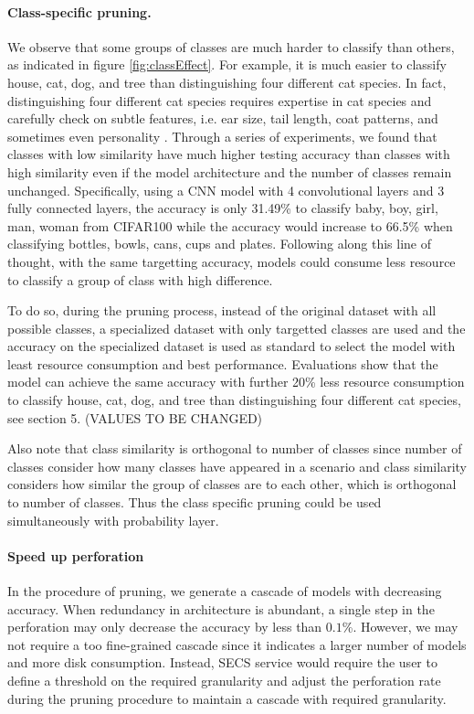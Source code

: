 \documentclass[pageno]{jpaper}
\begin{document}
\paragraph{Class-specific pruning.} 
We observe that some groups of classes are much harder to classify than others, as indicated in figure \ref{fig:classEffect}. For example, it is much easier to classify house, cat, dog, and tree than distinguishing four different cat species. In fact, distinguishing four different cat species requires expertise in cat species and carefully check on subtle features, i.e. ear size, tail length, coat patterns, and sometimes even personality \cite{cat2018}. Through a series of experiments, we found that classes with low similarity have much higher testing accuracy than classes with high similarity even if the model architecture and the number of classes remain unchanged. Specifically, using a CNN model with 4 convolutional layers and 3 fully connected layers, the accuracy is only 31.49\% to classify baby, boy, girl, man, woman from CIFAR100 while the accuracy would increase to 66.5\% when classifying bottles, bowls, cans, cups and plates. Following along this line of thought, with the same targetting accuracy, models could consume less resource to classify a group of class with high difference. 

To do so, during the pruning process, instead of the original dataset with all possible classes, a specialized dataset with only targetted classes are used and the accuracy on the specialized dataset is used as standard to select the model with least resource consumption and best performance. Evaluations show that the model can achieve the same accuracy with further 20\% less resource consumption to classify house, cat, dog, and tree than distinguishing four different cat species, see section 5. (VALUES TO BE CHANGED)

Also note that class similarity is orthogonal to number of classes since number of classes consider how many classes have appeared in a scenario and class similarity considers how similar the group of classes are to each other, which is orthogonal to number of classes. Thus the class specific pruning could be used simultaneously with probability layer.

\paragraph{Speed up perforation}
In the procedure of pruning, we generate a cascade of models with decreasing accuracy. When redundancy in architecture is abundant, a single step in the perforation may only decrease the accuracy by less than $0.1$\%. However, we may not require a too fine-grained cascade since it indicates a larger number of models and more disk consumption. Instead, SECS service would require the user to define a threshold on the required granularity and adjust the perforation rate during the pruning procedure to maintain a cascade with required granularity. 
\end{document}
